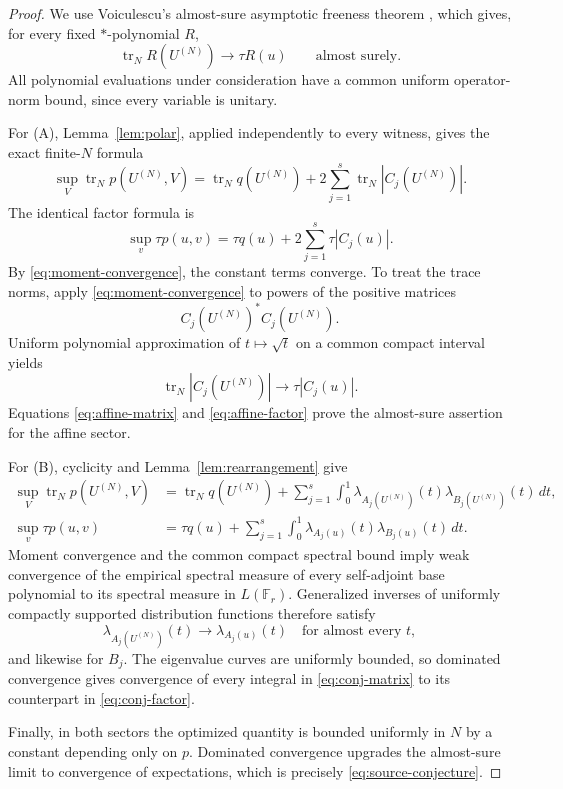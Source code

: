 \documentclass[11pt]{article}
\theoremstyle{remark}
\newcommand{\trN}{\operatorname{tr}_N}
\begin{document}
\begin{proof}
We use Voiculescu's almost-sure asymptotic freeness theorem \cite{Voi}, which
gives, for every fixed $*$-polynomial $R$,
\begin{equation}\label{eq:moment-convergence}
 \trN R(U^{(N)})\longrightarrow\tau R(u)
 \qquad\text{almost surely}.
\end{equation}
All polynomial evaluations under consideration have a common uniform
operator-norm bound, since every variable is unitary.

For \textup{(A)}, Lemma~\ref{lem:polar}, applied independently to every
witness, gives the exact finite-$N$ formula
\begin{equation}\label{eq:affine-matrix}
 \sup_V\trN p(U^{(N)},V)
 =\trN q(U^{(N)})+2\sum_{j=1}^s\trN|C_j(U^{(N)})|.
\end{equation}
The identical factor formula is
\begin{equation}\label{eq:affine-factor}
 \sup_v\tau p(u,v)=\tau q(u)+2\sum_{j=1}^s\tau|C_j(u)|.
\end{equation}
By \eqref{eq:moment-convergence}, the constant terms converge.  To treat the
trace norms, apply \eqref{eq:moment-convergence} to powers of the positive
matrices
\[
                    C_j(U^{(N)})^*C_j(U^{(N)}).
\]
Uniform polynomial approximation of $t\mapsto\sqrt t$ on a common compact
interval yields
\[
                  \trN|C_j(U^{(N)})|\longrightarrow\tau|C_j(u)|.
\]
Equations \eqref{eq:affine-matrix} and \eqref{eq:affine-factor} prove the
almost-sure assertion for the affine sector.

For \textup{(B)}, cyclicity and Lemma~\ref{lem:rearrangement} give
\begin{align}
 \sup_V\trN p(U^{(N)},V)
 &=\trN q(U^{(N)})
   +\sum_{j=1}^s\int_0^1
     \lambda_{A_j(U^{(N)})}(t)\lambda_{B_j(U^{(N)})}(t)\,dt,
 \label{eq:conj-matrix}\\
 \sup_v\tau p(u,v)
 &=\tau q(u)
   +\sum_{j=1}^s\int_0^1
     \lambda_{A_j(u)}(t)\lambda_{B_j(u)}(t)\,dt.
 \label{eq:conj-factor}
\end{align}
Moment convergence and the common compact spectral bound imply weak
convergence of the empirical spectral measure of every self-adjoint base
polynomial to its spectral measure in $L(\mathbb F_r)$.  Generalized inverses
of uniformly compactly supported distribution functions therefore satisfy
\[
 \lambda_{A_j(U^{(N)})}(t)\longrightarrow\lambda_{A_j(u)}(t)
 \quad\text{for almost every }t,
\]
and likewise for $B_j$.  The eigenvalue curves are uniformly bounded, so
dominated convergence gives convergence of every integral in
\eqref{eq:conj-matrix} to its counterpart in \eqref{eq:conj-factor}.

Finally, in both sectors the optimized quantity is bounded uniformly in $N$
by a constant depending only on $p$.  Dominated convergence upgrades the
almost-sure limit to convergence of expectations, which is precisely
\eqref{eq:source-conjecture}.
\end{proof}
\end{document}
